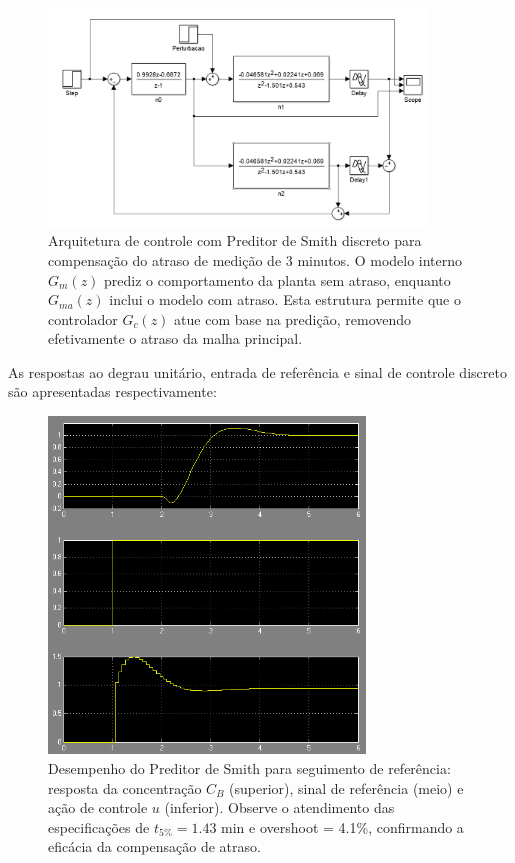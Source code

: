 \documentclass[a4paper,12pt]{article}
\begin{document}
 \begin{figure}[H]
  \centering
  \includegraphics[width=0.9\textwidth]{Imagens/q1.png}
  \caption{Arquitetura de controle com Preditor de Smith discreto para compensação do atraso de medição de 3 minutos. O modelo interno $G_m(z)$ prediz o comportamento da planta sem atraso, enquanto $G_{ma}(z)$ inclui o modelo com atraso. Esta estrutura permite que o controlador $G_c(z)$ atue com base na predição, removendo efetivamente o atraso da malha principal.}
  \end{figure}

As respostas ao degrau unitário, entrada de referência e sinal de controle discreto são apresentadas respectivamente:

   \begin{figure}[H]
  \centering
  \includegraphics[width=0.75\textwidth]{Imagens/q12.png}
  \caption{Desempenho do Preditor de Smith para seguimento de referência: resposta da concentração $C_B$ (superior), sinal de referência (meio) e ação de controle $u$ (inferior). Observe o atendimento das especificações de $t_{5\%} = 1.43$ min e overshoot = 4.1\%, confirmando a eficácia da compensação de atraso.}
  \end{figure}
\end{document}
